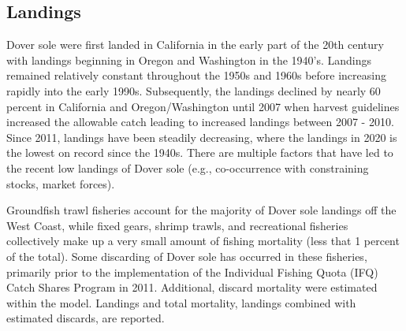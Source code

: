 \documentclass[11pt,
  english,
  a4paper,
]{article}
\begin{document}
\leavevmode\tagmcend\tagstructend\par


\hypertarget{landings}{%
\subsection*{Landings}\label{landings}}

\leavevmode\tagmcend\tagstructend


Dover sole were first landed in California in the early part of the 20th century with landings beginning in Oregon and Washington in the 1940's. Landings remained relatively constant throughout the 1950s and 1960s before increasing rapidly into the early 1990s. Subsequently, the landings declined by nearly 60 percent in California and Oregon/Washington until 2007 when harvest guidelines increased the allowable catch leading to increased landings between 2007 - 2010. Since 2011, landings have been steadily decreasing, where the landings in 2020 is the lowest on record since the 1940s. There are multiple factors that have led to the recent low landings of Dover sole (e.g., co-occurrence with constraining stocks, market forces).

\leavevmode\tagmcend\tagstructend\par


Groundfish trawl fisheries account for the majority of Dover sole landings off the West Coast, while fixed gears, shrimp trawls, and recreational fisheries collectively make up a very small amount of fishing mortality (less that 1 percent of the total). Some discarding of Dover sole has occurred in these fisheries, primarily prior to the implementation of the Individual Fishing Quota (IFQ) Catch Shares Program in 2011. Additional, discard mortality were estimated within the model. Landings and total mortality, landings combined with estimated discards, are reported.

\leavevmode\tagmcend\tagstructend\par

\clearpage



\end{document}
